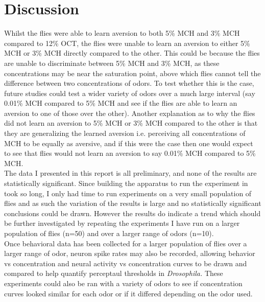 \documentclass{article}
\begin{document}

\section{Discussion}

Whilst the flies were able to learn aversion to both 5\% MCH and 3\% MCH compared to 12\% OCT, the flies were unable to learn an aversion to either 5\% MCH or 3\% MCH directly compared to the other. This could be because the flies are unable to discriminate between 5\% MCH and 3\% MCH, as these concentrations may be near the saturation point, above which flies cannot tell the difference between two concentrations of odors. To test whether this is the case, future studies could test a wider variety of odors over a much large interval (say 0.01\% MCH compared to 5\% MCH and see if the flies are able to learn an aversion to one of those over the other). Another explanation as to why the flies did not learn an aversion to 5\% MCH or 3\% MCH compared to the other is that they are generalizing the learned aversion i.e. perceiving all concentrations of MCH to be equally as aversive, and if this were the case then one would expect to see that flies would not learn an aversion to say 0.01\% MCH compared to 5\% MCH.\\

The data I presented in this report is all preliminary, and none of the results are statistically significant. Since building the apparatus to run the experiment in took so long, I only had time to run experiments on a very small population of flies and as such the variation of the results is large and no statistically significant conclusions could be drawn. However the results do indicate a trend which should be further investigated by repeating the experiments I have run on a larger population of flies (n=50) and over a larger range of odors (n=10). \\

Once behavioral data has been collected for a larger population of flies over a larger range of odor, neuron spike rates may also be recorded, allowing behavior vs concentration and neural activity vs concentration curves to be drawn and compared to help quantify perceptaul thresholds in \textit{Drosophila.} These experiments could also be ran with a variety of odors to see if concentration curves looked similar for each odor or if it differed depending on the odor used.
\end{document}
